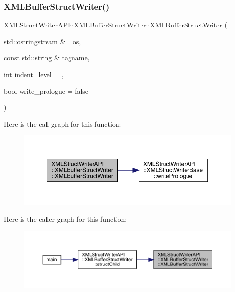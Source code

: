 \subsubsection{\texorpdfstring{XMLBufferStructWriter()}{XMLBufferStructWriter()}\hspace{0.1cm}{\footnotesize\ttfamily [1/2]}}
{\footnotesize\ttfamily X\+M\+L\+Struct\+Writer\+A\+P\+I\+::\+X\+M\+L\+Buffer\+Struct\+Writer\+::\+X\+M\+L\+Buffer\+Struct\+Writer (\begin{DoxyParamCaption}\item[{std\+::ostringstream \&}]{\+\_\+os,  }\item[{const std\+::string \&}]{tagname,  }\item[{int}]{indent\+\_\+level = {},  }\item[{bool}]{write\+\_\+prologue = {\ttfamily false} }\end{DoxyParamCaption})\hspace{0.3cm}{\ttfamily [inline]}}

Here is the call graph for this function\+:
\nopagebreak
\begin{figure}[H]
\begin{center}
\leavevmode
\includegraphics[width=350pt]{d2/d0a/classXMLStructWriterAPI_1_1XMLBufferStructWriter_adc348003ff0e12b5a820972cbc51a376_cgraph}
\end{center}
\end{figure}
Here is the caller graph for this function\+:\nopagebreak
\begin{figure}[H]
\begin{center}
\leavevmode
\includegraphics[width=350pt]{d2/d0a/classXMLStructWriterAPI_1_1XMLBufferStructWriter_adc348003ff0e12b5a820972cbc51a376_icgraph}
\end{center}
\end{figure}
\mbox{\label{classXMLStructWriterAPI_1_1XMLBufferStructWriter_a00bf336d98d848ad4552ee46ea32dd78}} 
